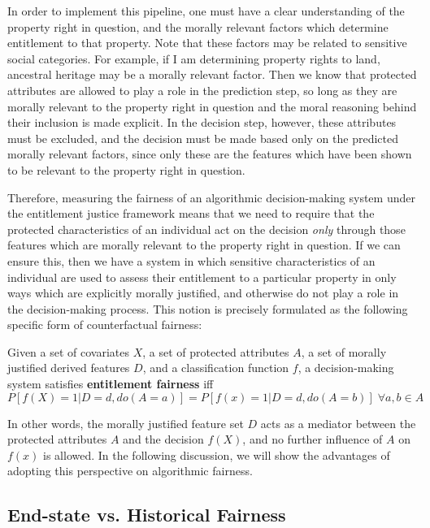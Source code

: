 In order to implement this pipeline, one must have a clear understanding of the
property right in question, and the morally relevant factors which determine
entitlement to that property. Note that these factors may be related to
sensitive social categories. For example, if I am determining property rights to
land, ancestral heritage may be a morally relevant factor. Then we know that
protected attributes are allowed to play a role in the prediction step, so long
as they are morally relevant to the property right in question and the moral
reasoning behind their inclusion is made explicit. In the decision step, however,
these attributes must be excluded, and the decision must be made based only on
the predicted morally relevant factors, since only these are the features which
have been shown to be relevant to the property right in question.

Therefore, measuring the fairness of an algorithmic decision-making system under
the entitlement justice framework means that we need to require that the
protected characteristics of an individual act on the decision \textit{only}
through those features which are morally relevant to the property right in
question. If we can ensure this, then we have a system in which sensitive
characteristics of an individual are used to assess their entitlement to a
particular property in only ways which are explicitly morally justified, and 
otherwise do not play a role in the decision-making process. This notion is
precisely formulated as the following specific form of counterfactual fairness:

\begin{definition}
    Given a set of covariates $X$, a set of protected attributes $A$, a set of
    morally justified derived features $D$, and a classification function $f$,
    a decision-making system satisfies \textbf{entitlement fairness} iff 
    \[P[f(X) = 1 | D=d, do(A = a)] = P[f(x) = 1 | D=d, do(A=b)]\;\forall a, b \in A\]
\end{definition}

In other words, the morally justified feature set $D$ acts as a mediator between
the protected attributes $A$ and the decision $f(X)$, and no further influence
of $A$ on $f(x)$ is allowed. In the following discussion, we will show the
advantages of adopting this perspective on algorithmic fairness.

\subsection{End-state vs. Historical Fairness}


